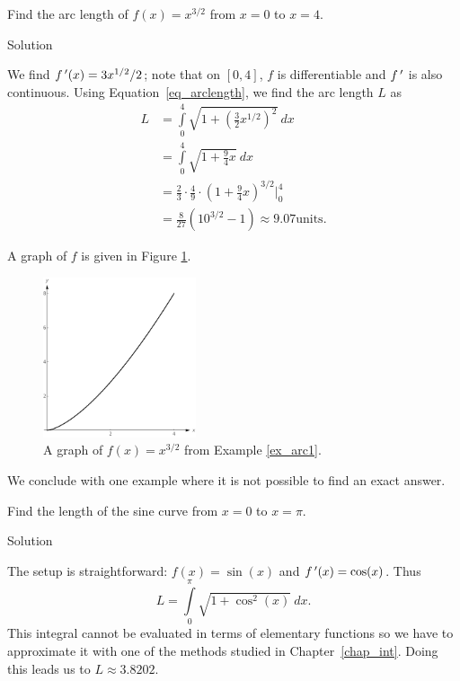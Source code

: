 \begin{example}\label{ex_arc1}
Find the arc length of $f(x) = x^{3/2}$ from $x=0$ to $x=4$. 

Solution 

We find $f\,'(x)= 3x^{1/2}/2$; note that on $[0,4]$, $f$ is differentiable  and $f\,'$ is also continuous. Using Equation~\eqref{eq_arclength}, we find the arc length $L$ as
\allowdisplaybreaks
\begin{align*}
	L &=	\int\limits_0^4 \sqrt{1+\left(\frac32x^{1/2}\right)^2}\ dx \\[0.2cm]
		&=	\int\limits_0^4 \sqrt{1+\frac94x} \ dx \\[0.2cm]
		&=  \frac23\cdot\frac49\cdot\left(1+\frac94x\right)^{3/2}\Big|_0^4 \\[0.2cm]
		&=\frac{8}{27}\left(10^{3/2}-1\right) \approx 9.07 \text{units}.
\end{align*}

	A graph of $f$ is given in Figure \ref{fig_int_app_23}.
	
	
	\begin{figure}[H]
	\begin{center}
			\includegraphics[width=0.4\textwidth]{fig_int_app_23}
	\caption{A graph of $f(x) = x^{3/2}$ from Example \ref{ex_arc1}.}
	\label{fig_int_app_23}
	\end{center}
\end{figure}

\end{example}


We conclude with one example where it is not possible to find an exact answer. 

\begin{example}\label{ex_arc3}
Find the length of the sine curve from $x=0$ to $x=\pi$.

Solution 


The setup is straightforward: $f(x) = \sin(x)$ and $f\,'(x) = \cos(x)$. Thus 
$$L = \int\limits_0^\pi \sqrt{1+\cos^2(x)}\ dx.$$
This integral cannot be evaluated in terms of elementary functions so we have to approximate it with one of the methods studied in Chapter~\ref{chap_int}. Doing this leads us to  $L\approx 3.8202$.  
\end{example}

